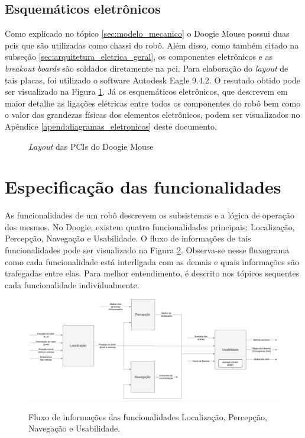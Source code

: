 \subsection{Esquemáticos eletrônicos}
\label{ssec:esquematicos_eletronicos}
Como explicado no tópico \ref{sec:modelo_mecanico} o Doogie Mouse possui duas \glspl*{pci} que são utilizadas como chassi do robô. Além disso, como também citado na subseção \ref{sec:arquitetura_eletrica_geral}, os componentes eletrônicos e as \textit{breakout boards} são soldados diretamente na \gls*{pci}. Para elaboração do \textit{layout} de tais placas, foi utilizado o software Autodesk Eagle 9.4.2. O resutado obtido pode ser visualizado na Figura \ref{fig:doogie_boards}. Já os esquemáticos eletrônicos, que descrevem em maior detalhe as ligações elétricas entre todos os componentes do robô bem como o valor das grandezas físicas dos elementos eletrônicos, podem ser visualizados no Apêndice \ref{apend:diagramas_eletronicos} deste documento.

\begin{figure}[H]
	\centering
	\caption{\textit{Layout} das PCIs do Doogie Mouse}
	\label{fig:doogie_boards}
\end{figure}

\section{Especificação das funcionalidades}
\label{sec:especificacao_das_funcionalidades}
As funcionalidades de um robô descrevem os subsistemas e a lógica de operação dos mesmos. No Doogie, existem quatro funcionalidades principais: Localização, Percepção, Navegação e Usabilidade. O fluxo de informações de tais funcionalidades pode ser visualizado na Figura \ref{fig:especificacao_funcional_geral}. Observa-se nesse fluxograma como cada funcionalidade está interligada com as demais e quais informações são trafegadas entre elas. Para melhor entendimento, é descrito nos tópicos sequentes cada funcionalidade individualmente.

\begin{figure}[H]
	\centering
	\captionsetup{justification=centering}
	\caption{Fluxo de informações das funcionalidades Localização, Percepção, Navegação e Usabilidade.}
	\includegraphics[width=1\textwidth]
	{Figures/especificacao_funcional_geral}
	\label{fig:especificacao_funcional_geral}
\end{figure}

